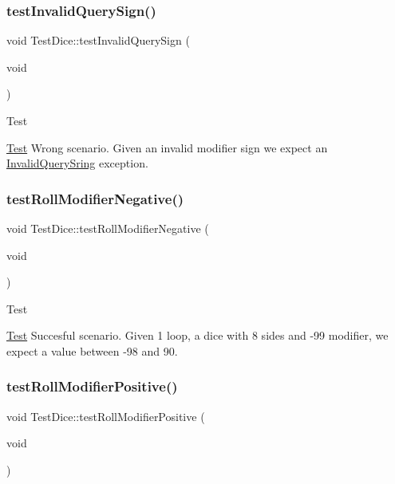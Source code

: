 \subsubsection{\texorpdfstring{test\+Invalid\+Query\+Sign()}{testInvalidQuerySign()}}
{\footnotesize\ttfamily void Test\+Dice\+::test\+Invalid\+Query\+Sign (\begin{DoxyParamCaption}\item[{void}]{ }\end{DoxyParamCaption})\hspace{0.3cm}{\ttfamily [protected]}}

\begin{DoxyRefDesc}{Test}
\item[\hyperlink{test__test000010}{Test}]Wrong scenario. Given an invalid modifier sign we expect an \hyperlink{struct_invalid_query_sring}{Invalid\+Query\+Sring} exception. \end{DoxyRefDesc}
\hypertarget{class_test_dice_a4abec357f77e11c1bf199efc0863ffeb}{}\label{class_test_dice_a4abec357f77e11c1bf199efc0863ffeb} 
\subsubsection{\texorpdfstring{test\+Roll\+Modifier\+Negative()}{testRollModifierNegative()}}
{\footnotesize\ttfamily void Test\+Dice\+::test\+Roll\+Modifier\+Negative (\begin{DoxyParamCaption}\item[{void}]{ }\end{DoxyParamCaption})\hspace{0.3cm}{\ttfamily [protected]}}

\begin{DoxyRefDesc}{Test}
\item[\hyperlink{test__test000005}{Test}]Succesful scenario. Given 1 loop, a dice with 8 sides and -\/99 modifier, we expect a value between -\/98 and 90. \end{DoxyRefDesc}
\hypertarget{class_test_dice_a0e72b077dd7809a8477f769ee6183232}{}\label{class_test_dice_a0e72b077dd7809a8477f769ee6183232} 
\subsubsection{\texorpdfstring{test\+Roll\+Modifier\+Positive()}{testRollModifierPositive()}}
{\footnotesize\ttfamily void Test\+Dice\+::test\+Roll\+Modifier\+Positive (\begin{DoxyParamCaption}\item[{void}]{ }\end{DoxyParamCaption})\hspace{0.3cm}{\ttfamily [protected]}}

